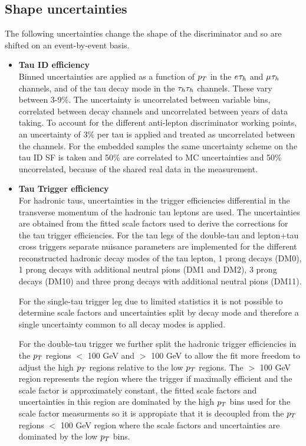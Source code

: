 \subsection{Shape uncertainties}
\label{sec:shape_uncerts}
The following uncertainties change the shape of the discriminator and so are shifted on an event-by-event basis.
\begin{itemize}
\item \textbf{Tau ID efficiency}\\
Binned uncertainties are applied as a function of $p_{T}$ in the $e_{}\tau_{h}$ and $\mu_{}\tau_{h}$ channels, and of the tau decay mode in the $\tau_{h}\tau_{h}$ channels. 
These vary between 3-9\%.
The uncertainty is uncorrelated between variable bins, correlated between decay channels and uncorrelated between years of data taking.
To account for the different anti-lepton discriminator working points, an uncertainty of 3\% per tau is applied and treated as uncorrelated between the channels.
For the embedded samples the same uncertainty scheme on the tau ID SF is taken and 50\% are correlated to MC uncertainties and 50\% uncorrelated, because of the shared real data in the measurement.

\item \textbf{Tau Trigger efficiency}\\
For hadronic taus, uncertainties in the trigger efficiencies differential in the transverse momentum of the hadronic tau leptons are used.
The uncertainties are obtained from the fitted scale factors used to derive the corrections for the tau trigger efficiencies.
For the tau legs of the double-tau and lepton+tau cross triggers separate nuisance parameters are implemented for the different reconstructed hadronic decay modes of the tau lepton, 1 prong decays (DM0),
1 prong decays with additional neutral pions (DM1 and DM2), 3 prong decays (DM10) and three prong decays with additional neutral pions (DM11).

For the single-tau trigger leg due to limited statistics it is not possible to determine scale factors and uncertainties split by decay mode and therefore a single uncertainty common to all decay
modes is applied.

For the double-tau trigger we further split the hadronic trigger efficiencies in the $p_{T}$ regions $<$ 100 GeV and $>$ 100 GeV to allow the fit more freedom to adjust the high $p_{T}$ regions relative to the low $p_{T}$ regions. The $>$ 100 GeV region represents the region where the trigger if maximally efficient and the scale factor is approximately constant, the fitted scale factors and uncertainties in this region are dominated by the high $p_{T}$ bins used for the scale factor measurments so it is appropiate that it is decoupled from the $p_{T}$ regions $<$ 100 GeV region where the scale factors and uncertainties are dominated by the low $p_{T}$ bins. 


\end{itemize}
